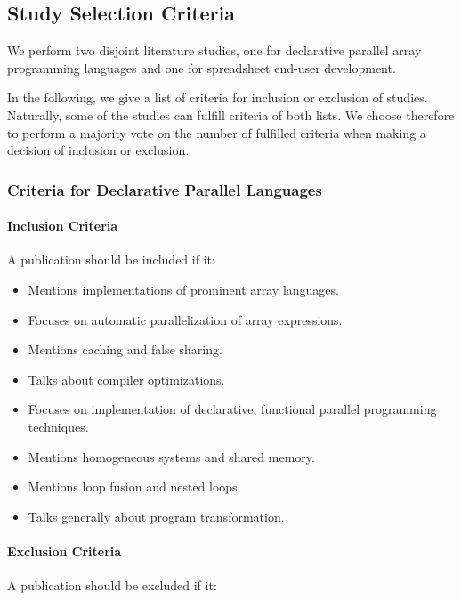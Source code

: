 \documentclass[a4paper]{article}
\begin{document}
\subsection{Study Selection Criteria}
\label{sec:study-select-crit}

We perform two disjoint literature studies, one for declarative
parallel array programming languages and one for spreadsheet end-user
development.

In the following, we give a list of criteria for inclusion or
exclusion of studies. Naturally, some of the studies can fulfill
criteria of both lists. We choose therefore to perform a majority vote
on the number of fulfilled criteria when making a decision of
inclusion or exclusion.

\subsubsection{Criteria for Declarative Parallel Languages}
\label{sec:crit-decl-parall}

\paragraph{Inclusion Criteria}

A publication should be included if it:

\begin{itemize}
\item Mentions implementations of prominent array languages.
\item Focuses on automatic parallelization of array expressions.
\item Mentions caching and false sharing.
\item Talks about compiler optimizations.
\item Focuses on implementation of declarative, functional parallel
  programming techniques.
\item Mentions homogeneous systems and shared memory.
\item Mentions loop fusion and nested loops.
\item Talks generally about program transformation.
\end{itemize}

\paragraph{Exclusion Criteria}

A publication should be excluded if it:
\end{document}
